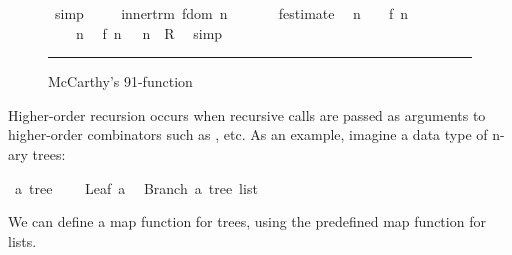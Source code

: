 \begin{isabellebody}
\begin{figure}
\begin{minipage}{0.8\textwidth}
\ simp\ %
\isanewline
\isanewline
\ \ \isamarkupfalse%
\ inner{\isacharunderscore}trm{\isacharcolon}\ {\isachardoublequoteopen}f{}{}{\isacharunderscore}dom\ {\isacharparenleft}n\ {\isacharplus}\ {}{}{\isacharparenright}{\isachardoublequoteclose}\ %
\isanewline
\ \ \isamarkupfalse%
\ f{}{}{\isacharunderscore}estimate\ \isamarkupfalse%
\ {\isachardoublequoteopen}n\ {\isacharplus}\ {}{}\ {\isacharless}\ f{}{}\ {\isacharparenleft}n\ {\isacharplus}\ {}{}{\isacharparenright}\ {\isacharplus}\ {}{}{\isachardoublequoteclose}\ \isacommand{{\isachardot}}\isamarkupfalse%
\isanewline
\ \ \isamarkupfalse%
\ {\isacharbackquoteopen}{\isasymnot}\ {}{}{}\ {\isacharless}\ n{\isacharbackquoteclose}\ \isamarkupfalse%
\ {\isachardoublequoteopen}{\isacharparenleft}f{}{}\ {\isacharparenleft}n\ {\isacharplus}\ {}{}{\isacharparenright}{\isacharcomma}\ n{\isacharparenright}\ {\isasymin}\ {\isacharquery}R{\isachardoublequoteclose}\ \isamarkupfalse%
\ simp\ \isanewline
{}\isamarkupfalse%
%
\endisatagproof
{\isafoldproof}%
%
\isadelimproof
%
\endisadelimproof
%
\isamarkupfalse{}
\end{minipage}
\vspace{6pt}\hrule
\caption{McCarthy's 91-function}\label{f91}
\end{figure}
%
\isamarkuptrue%
%
\begin{isamarkuptext}%
Higher-order recursion occurs when recursive calls
  are passed as arguments to higher-order combinators such as ,  etc.
  As an example, imagine a data type of n-ary trees:%
\end{isamarkuptext}%
\isamarkuptrue%
\isamarkupfalse%
\ {\isacharprime}a\ tree\ {\isacharequal}\ \isanewline
\ \ Leaf\ {\isacharprime}a\ \isanewline
{\isacharbar}\ Branch\ {\isachardoublequoteopen}{\isacharprime}a\ tree\ list{\isachardoublequoteclose}%
\begin{isamarkuptext}%
\noindent We can define a map function for trees, using the predefined
  map function for lists.%
\end{isamarkuptext}%
\isamarkuptrue%
\isamarkupfalse%

\end{isabellebody}
